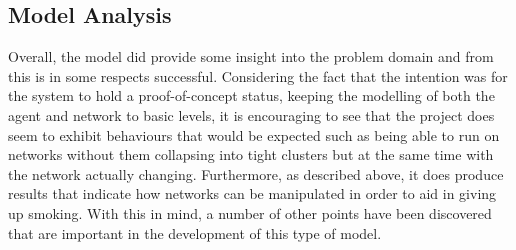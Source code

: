 \documentclass[]{report}
\begin{document}
\subsection{Model Analysis}
Overall, the model did provide some insight into the problem domain and from this is in some respects successful. Considering the fact that the intention was for the system to hold a proof-of-concept status, keeping the modelling of both the agent and network to basic levels, it is encouraging to see that the project does seem to exhibit behaviours that would be expected such as being able to run on networks without them collapsing into tight clusters but at the same time with the network actually changing. Furthermore, as described above, it does produce results that indicate how networks can be manipulated in order to aid in giving up smoking. With this in mind, a number of other points have been discovered that are important in the development of this type of model.
\end{document}
